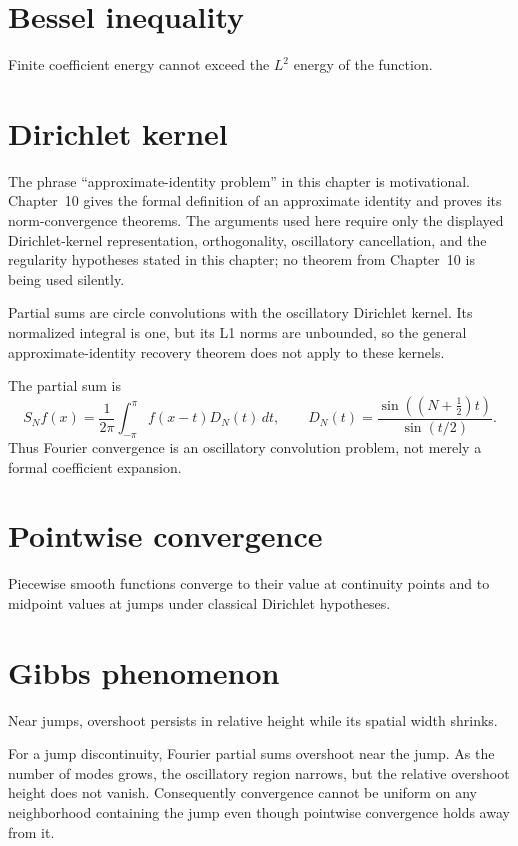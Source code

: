 \section{Bessel inequality}
Finite coefficient energy cannot exceed the $L^2$ energy of the function.

\section{Dirichlet kernel}
\begin{remark}
The phrase ``approximate-identity problem'' in this chapter is motivational.
Chapter~10 gives the formal definition of an approximate identity and proves
its norm-convergence theorems.  The arguments used here require only the
displayed Dirichlet-kernel representation, orthogonality, oscillatory
cancellation, and the regularity hypotheses stated in this chapter; no theorem
from Chapter~10 is being used silently.
\end{remark}
Partial sums are circle convolutions with the oscillatory Dirichlet kernel. Its normalized integral is one, but its L1 norms are unbounded, so the general approximate-identity recovery theorem does not apply to these kernels.


\begin{example}\label{ex:iii09-expand-02}
The partial sum is
\[
S_Nf(x)=\frac1{2\pi}\int_{-\pi}^{\pi}f(x-t)D_N(t)\,dt,
\qquad
D_N(t)=\frac{\sin((N+\tfrac12)t)}{\sin(t/2)}.
\]
Thus Fourier convergence is an oscillatory convolution problem, not merely a
formal coefficient expansion.
\end{example}
\section{Pointwise convergence}
Piecewise smooth functions converge to their value at continuity points and to midpoint values at jumps under classical Dirichlet hypotheses.

\section{Gibbs phenomenon}
Near jumps, overshoot persists in relative height while its spatial width shrinks.


\begin{example}\label{ex:iii09-expand-03}
For a jump discontinuity, Fourier partial sums overshoot near the jump. As the
number of modes grows, the oscillatory region narrows, but the relative
overshoot height does not vanish. Consequently convergence cannot be uniform on
any neighborhood containing the jump even though pointwise convergence holds
away from it.
\end{example}
